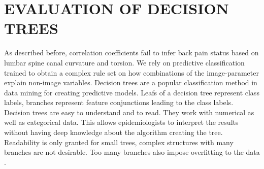 \documentclass[a4paper,twoside]{style/article}
\newcommand{\com}[1]{\textcolor{orange}{\uline{#1}}}
\begin{document}
%


\section{\uppercase{Evaluation of Decision Trees}}
\label{sec:DecisionTrees}
\noindent As described before, correlation coefficients fail to infer back pain status based on lumbar spine canal curvature and torsion.
We rely on predictive classification trained to obtain a complex rule set on how combinations of the image-parameter explain non-image variables.
Decision trees are a popular classification method in data mining for creating predictive models.
Leafs of a decision tree represent class labels, branches represent feature conjunctions leading to the class labels.
Decision trees are easy to understand and to read.
They work with numerical as well as categorical data.
This allows epidemiologists to interpret the results without having deep knowledge about the algorithm creating the tree.
Readability is only granted for small trees, complex structures with many branches are not desirable.
Too many branches also impose overfitting to the data \cite{DecisionTree}.
\end{document}
